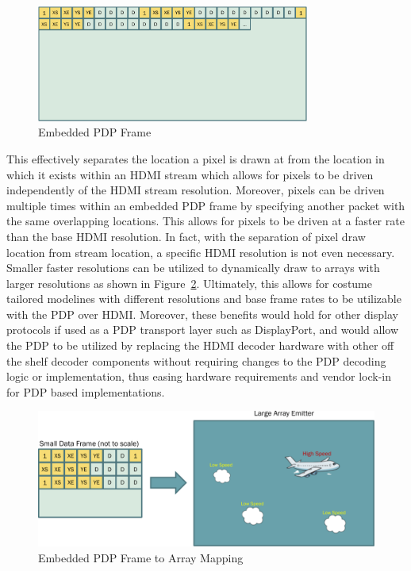     \begin{figure}
        \centering
        \includegraphics[width=0.8\textwidth]{fig/embedded_frame.pdf}
        \caption{Embedded PDP Frame}
        \label{fig:embedded_frame}
    \end{figure}

    This effectively separates the location a pixel is drawn at from the location in which it exists within an HDMI stream which allows for pixels to be driven independently of the HDMI stream resolution. Moreover, pixels can be driven multiple times within an embedded PDP frame by specifying another packet with the same overlapping locations. This allows for pixels to be driven at a faster rate than the base HDMI resolution. In fact, with the separation of pixel draw location from stream location, a specific HDMI resolution is not even necessary. Smaller faster resolutions can be utilized to dynamically draw to arrays with larger resolutions as shown in Figure~\ref{fig:embedded_frame_to_emitter}. Ultimately, this allows for costume tailored modelines with different resolutions and base frame rates to be utilizable with the PDP over HDMI. Moreover, these benefits would hold for other display protocols if used as a PDP transport layer such as DisplayPort, and would allow the PDP to be utilized by replacing the HDMI decoder hardware with other off the shelf decoder components without requiring changes to the PDP decoding logic or implementation, thus easing hardware requirements and vendor lock-in for PDP based implementations.

    \begin{figure}
        \centering
        \includegraphics[width=1.0\textwidth]{fig/embedded_frame_to_emitter.pdf}
        \caption{Embedded PDP Frame to Array Mapping}
        \label{fig:embedded_frame_to_emitter}
    \end{figure}

